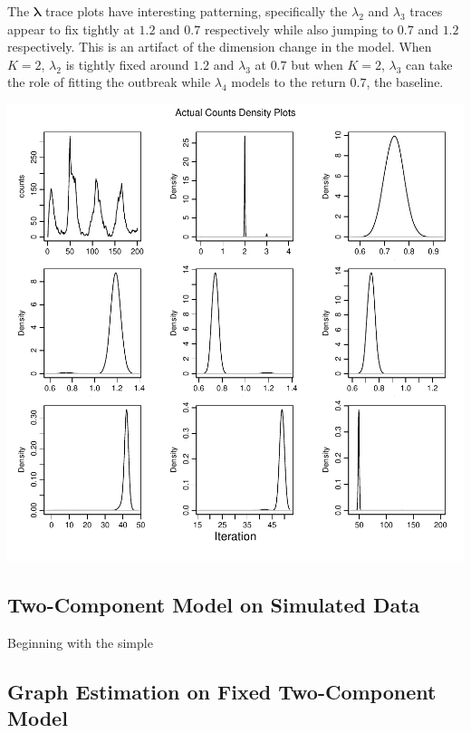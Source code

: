 \documentclass[]{article}
\numberwithin{equation}{section}
\begin{document}
The \(\boldsymbol{\lambda}\) trace plots have interesting patterning,
specifically the \(\lambda_2\) and \(\lambda_3\) traces appear to fix
tightly at \(1.2\) and \(0.7\) respectively while also jumping to
\(0.7\) and \(1.2\) respectively. This is an artifact of the dimension
change in the model. When \(K = 2\), \(\lambda_2\) is tightly fixed
around \(1.2\) and \(\lambda_3\) at \(0.7\) but when \(K = 2\),
\(\lambda_3\) can take the role of fitting the outbreak while
\(\lambda_4\) models to the return \(0.7\), the baseline.

\includegraphics{thesis_draft_files/figure-latex/density_plots-1.pdf}

\hypertarget{two-component-model-on-simulated-data}{%
\subsection{Two-Component Model on Simulated
Data}\label{two-component-model-on-simulated-data}}

Beginning with the simple

\hypertarget{graph-estimation-on-fixed-two-component-model}{%
\subsection{Graph Estimation on Fixed Two-Component
Model}\label{graph-estimation-on-fixed-two-component-model}}
\end{document}
